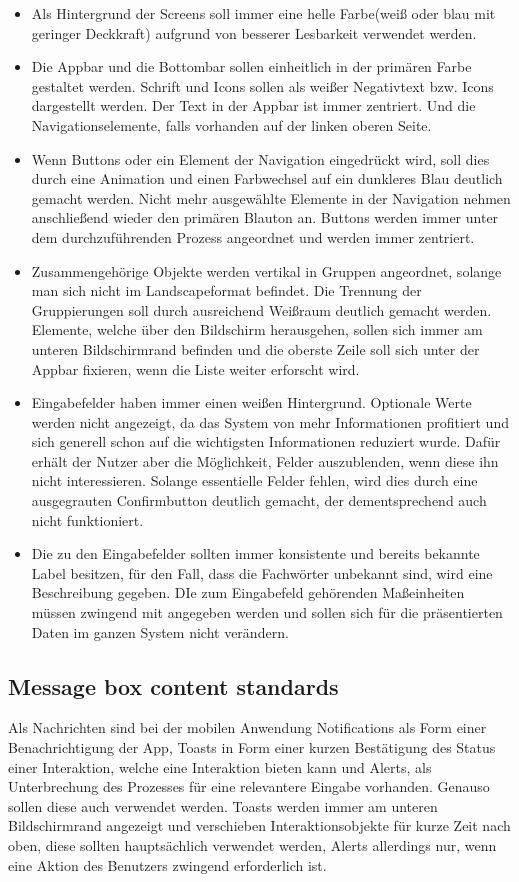 \begin{itemize}
\item Als Hintergrund der Screens soll immer eine helle Farbe(weiß oder blau mit geringer Deckkraft) aufgrund von besserer Lesbarkeit verwendet werden.
\item Die Appbar und die Bottombar sollen einheitlich in der primären Farbe gestaltet werden. Schrift und Icons sollen als weißer Negativtext bzw. Icons dargestellt werden. Der Text in der Appbar ist immer zentriert. Und die Navigationselemente, falls vorhanden auf der linken oberen Seite.
\item Wenn Buttons oder ein Element der Navigation eingedrückt wird, soll dies durch eine Animation und einen Farbwechsel auf ein dunkleres Blau deutlich gemacht werden. Nicht mehr ausgewählte Elemente in der Navigation nehmen anschließend wieder den primären Blauton an. Buttons werden immer unter dem durchzuführenden Prozess angeordnet und werden immer zentriert.
\item Zusammengehörige Objekte werden vertikal in Gruppen angeordnet, solange man sich nicht im Landscapeformat befindet. Die Trennung der Gruppierungen soll durch ausreichend Weißraum deutlich gemacht werden. Elemente, welche über den Bildschirm herausgehen, sollen sich immer am unteren Bildschirmrand befinden und die oberste Zeile soll sich unter der Appbar fixieren, wenn die Liste weiter erforscht wird.
\item Eingabefelder haben immer einen weißen Hintergrund. Optionale Werte werden nicht angezeigt, da das System von mehr Informationen profitiert und sich generell schon auf die wichtigsten Informationen reduziert wurde. Dafür erhält der Nutzer aber die Möglichkeit, Felder auszublenden, wenn diese ihn nicht interessieren. Solange essentielle Felder fehlen, wird dies durch eine ausgegrauten Confirmbutton deutlich gemacht, der dementsprechend auch nicht funktioniert.
\item Die zu den Eingabefelder sollten immer konsistente und bereits bekannte Label besitzen, für den Fall, dass die Fachwörter unbekannt sind, wird eine Beschreibung gegeben. DIe zum Eingabefeld gehörenden Maßeinheiten müssen zwingend mit angegeben werden und sollen sich für die präsentierten Daten im ganzen System nicht verändern. 
\end{itemize}

\subsection{Message box content standards}
Als Nachrichten sind bei der mobilen Anwendung Notifications als Form einer Benachrichtigung der App, Toasts in Form einer kurzen Bestätigung des Status einer Interaktion, welche eine Interaktion bieten kann und Alerts, als Unterbrechung des Prozesses für eine relevantere Eingabe vorhanden. Genauso sollen diese auch verwendet werden. 
Toasts werden immer am unteren Bildschirmrand angezeigt und verschieben Interaktionsobjekte für kurze Zeit nach oben, diese sollten hauptsächlich verwendet werden, Alerts allerdings nur, wenn eine Aktion des Benutzers zwingend erforderlich ist.

